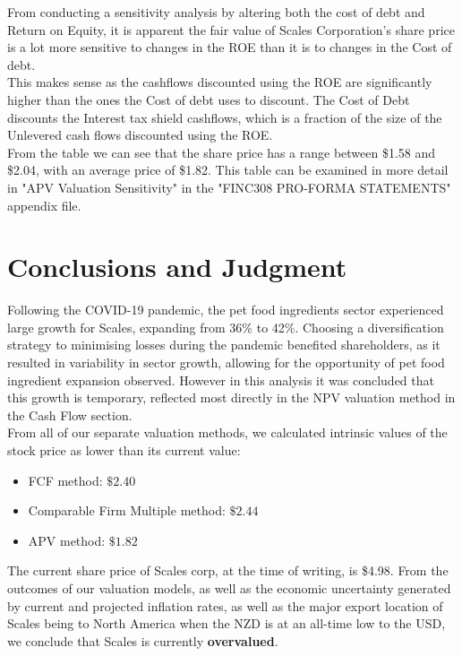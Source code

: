 \documentclass{article}
\begin{document}
From conducting a sensitivity analysis by altering both the cost of debt and Return on Equity, it is apparent the fair value of Scales Corporation's share price is a lot more sensitive to changes in the ROE than it is to changes in the Cost of debt. \\

This makes sense as the cashflows discounted using the ROE are significantly higher than the ones the Cost of debt uses to discount. The Cost of Debt discounts the Interest tax shield cashflows, which is a fraction of the size of the Unlevered cash flows discounted using the ROE. \\

From the table we can see that the share price has a range between \$1.58 and \$2.04, with an average price of \$1.82. This table can be examined in more detail in "APV Valuation Sensitivity" in the "FINC308 PRO-FORMA STATEMENTS" appendix file.


\section{Conclusions and Judgment}
Following the COVID-19 pandemic, the pet food ingredients sector experienced large growth for Scales, expanding from 36\% to 42\%. 
Choosing a diversification strategy to minimising losses during the pandemic benefited shareholders, as it resulted in variability in sector growth, allowing for the opportunity of pet food ingredient expansion observed. However in this analysis it was concluded that this growth is temporary, reflected most directly in the NPV valuation method in the Cash Flow section.\\

From all of our separate valuation methods, we calculated intrinsic values of the stock price as lower than its current value:
\begin{itemize}
    \item FCF method: $\$2.40$
    \item Comparable Firm Multiple method: $\$2.44$
    \item APV method: $\$1.82$
\end{itemize}

The current share price of Scales corp, at the time of writing, is \$4.98. From the outcomes of our valuation models, as well as the economic uncertainty generated by current and projected inflation rates, as well as the major export location of Scales being to North America when the NZD is at an all-time low to the USD, we conclude that Scales is currently \textbf{overvalued}.\\
\end{document}
